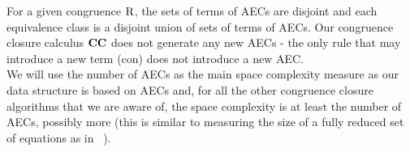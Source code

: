 For a given congruence $\mathrm{R}$, the sets of terms of AECs are disjoint and each equivalence class is a disjoint union of sets of terms of AECs.
Our congruence closure calculus $\mathrm{\mathbf{CC}}$ does not generate any new AECs - the only rule that may introduce a new term (con) does not introduce a new AEC.\\
We will use the number of AECs as the main space complexity measure as our data structure is based on AECs and, for all the other congruence closure algorithms that we are aware of, the space complexity is at least the number of AECs, possibly more (this is similar to measuring the size of a fully reduced set of equations as in ~\cite{GulwaniTiwariNecula04}).

